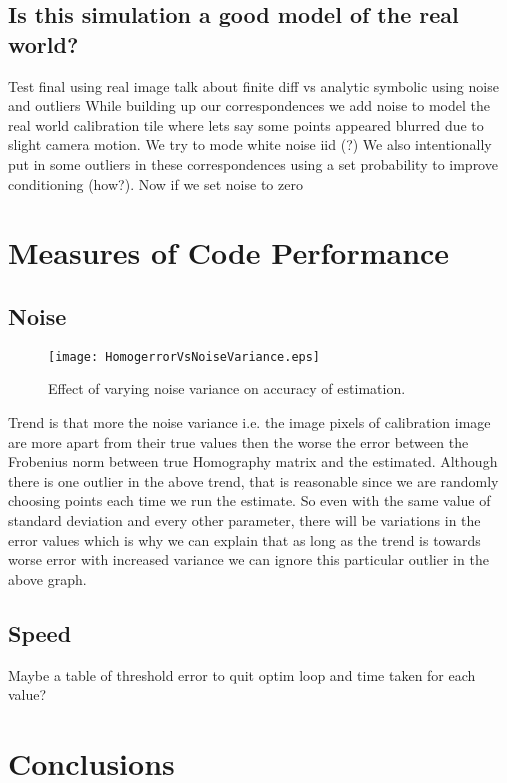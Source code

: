 \documentclass[titlepage]{article}
\begin{document}
\subsection{Is this simulation a good model of the real world?}

Test final using real image
talk about finite diff vs analytic symbolic
using noise and outliers
While building up our correspondences we add noise to model the real world calibration tile where lets say some points appeared blurred due to slight camera motion. We try to mode white noise iid (?)
We also intentionally put in some outliers in these correspondences using a set probability to improve conditioning (how?).
Now if we set noise to zero 

\section{Measures of Code Performance}
\subsection{Noise}
\begin{wrapfigure}{r}{5.5cm}
\caption{Effect of varying noise variance on accuracy of estimation.}\label{wrap-fig:1}
\texttt{[image: HomogerrorVsNoiseVariance.eps]}
\end{wrapfigure} 
Trend is that more the noise variance i.e. the image pixels of calibration image are more apart from their true values then the worse the error between the Frobenius norm between true Homography matrix and the estimated. Although there is one outlier in the above trend, that is reasonable since we are randomly choosing points each time we run the estimate. So even with the same value of standard deviation and every other parameter, there will be variations in the error values which is why we can explain that as long as the trend is towards worse error with increased variance we can ignore this particular outlier in the above graph.

\subsection{Speed}
Maybe a table of threshold error to quit optim loop and time taken for each value?



\section{Conclusions}
\end{document}
